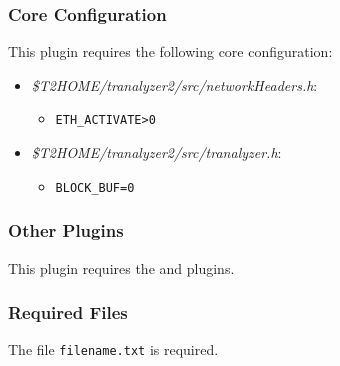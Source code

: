 \documentclass[documentation]{subfiles}
\begin{document}
\subsubsection{Core Configuration}
This plugin requires the following core configuration:
\begin{itemize}
    \item {\em \$T2HOME/tranalyzer2/src/networkHeaders.h}:
        \begin{itemize}
            \item {\tt ETH\_ACTIVATE>0}
        \end{itemize}
    \item {\em \$T2HOME/tranalyzer2/src/tranalyzer.h}:
        \begin{itemize}
            \item {\tt BLOCK\_BUF=0}
        \end{itemize}
\end{itemize}

\subsubsection{Other Plugins}
This plugin requires the  and  plugins.

\subsubsection{Required Files}
The file {\tt filename.txt} is required.
\end{document}
